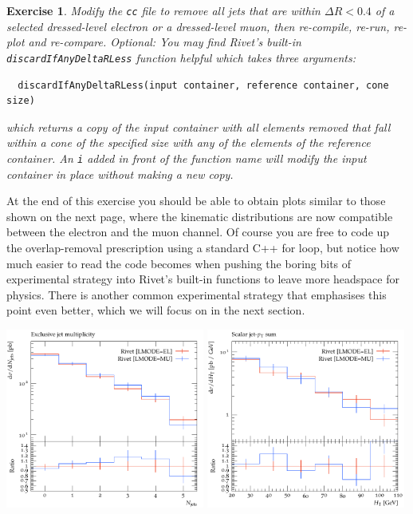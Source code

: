 \documentclass[10pt,fleqn]{scrartcl}
\theoremstyle{exstyle}
\newtheorem{exercise}{Exercise}
\begin{document}
\begin{exercise}
Modify the \verb|cc| file to remove all jets that are within $\Delta R < 0.4$
of a selected dressed-level electron or a dressed-level muon, 
then re-compile, re-run, re-plot and re-compare.
\emph{Optional:} You may find Rivet's built-in \verb|discardIfAnyDeltaRLess| function
helpful which takes three arguments:
\begin{verbatim}
  discardIfAnyDeltaRLess(input container, reference container, cone size)
\end{verbatim}
which returns a copy of the input container with all elements removed
that fall within a cone of the specified size with any of the elements
of the reference container. An \verb|i| added in front of the function
name will modify the input container in place without making a new copy.
\end{exercise}

At the end of this exercise you should be able to obtain plots similar 
to those shown on the next page, where the kinematic distributions 
are now compatible between the electron and the muon channel.
Of course you are free to code up the overlap-removal prescription
using a standard C++ for loop, but notice how much easier to read
the code becomes when pushing the boring bits of experimental
strategy into Rivet's built-in functions to leave more headspace
for physics. 
There is another common experimental strategy that emphasises 
this point even better, which we will focus on in the next section.

\begin{center}
\includegraphics[width=0.49\textwidth]{figures/jets_excl.pdf}
\includegraphics[width=0.49\textwidth]{figures/HT.pdf}
\end{center}
\end{document}

